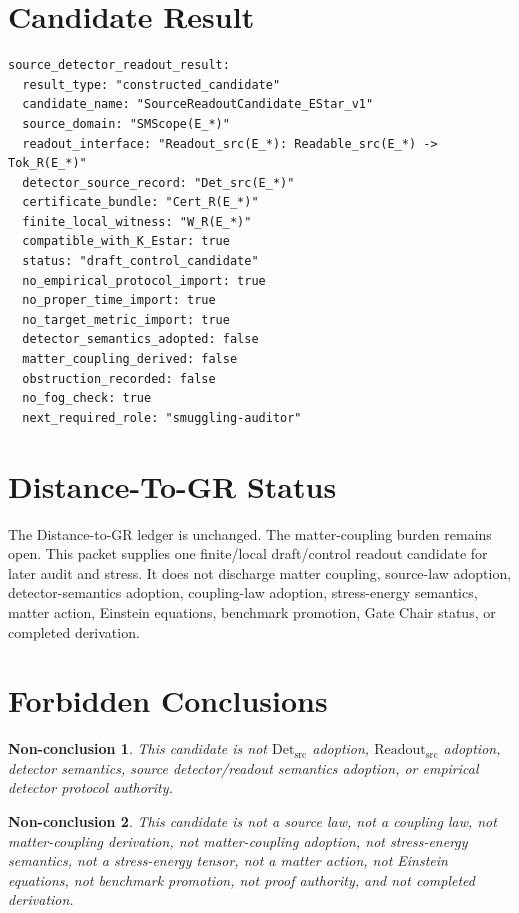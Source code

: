 \documentclass[11pt]{article}
\newcommand{\ReadoutSrc}{\mathrm{Readout}_{\mathrm{src}}}
\newcommand{\DetSrc}{\mathrm{Det}_{\mathrm{src}}}
\newtheorem{nonconclusion}{Non-conclusion}
\begin{document}
\section{Candidate Result}

\begin{verbatim}
source_detector_readout_result:
  result_type: "constructed_candidate"
  candidate_name: "SourceReadoutCandidate_EStar_v1"
  source_domain: "SMScope(E_*)"
  readout_interface: "Readout_src(E_*): Readable_src(E_*) -> Tok_R(E_*)"
  detector_source_record: "Det_src(E_*)"
  certificate_bundle: "Cert_R(E_*)"
  finite_local_witness: "W_R(E_*)"
  compatible_with_K_Estar: true
  status: "draft_control_candidate"
  no_empirical_protocol_import: true
  no_proper_time_import: true
  no_target_metric_import: true
  detector_semantics_adopted: false
  matter_coupling_derived: false
  obstruction_recorded: false
  no_fog_check: true
  next_required_role: "smuggling-auditor"
\end{verbatim}

\section{Distance-To-GR Status}

The Distance-to-GR ledger is unchanged. The matter-coupling burden remains
open. This packet supplies one finite/local draft/control readout candidate
for later audit and stress. It does not discharge matter coupling, source-law
adoption, detector-semantics adoption, coupling-law adoption, stress-energy
semantics, matter action, Einstein equations, benchmark promotion, Gate Chair
status, or completed derivation.

\section{Forbidden Conclusions}

\begin{nonconclusion}
This candidate is not \(\DetSrc\) adoption, \(\ReadoutSrc\) adoption, detector
semantics, source detector/readout semantics adoption, or empirical detector
protocol authority.
\end{nonconclusion}

\begin{nonconclusion}
This candidate is not a source law, not a coupling law, not matter-coupling
derivation, not matter-coupling adoption, not stress-energy semantics, not a
stress-energy tensor, not a matter action, not Einstein equations, not
benchmark promotion, not proof authority, and not completed derivation.
\end{nonconclusion}
\end{document}
